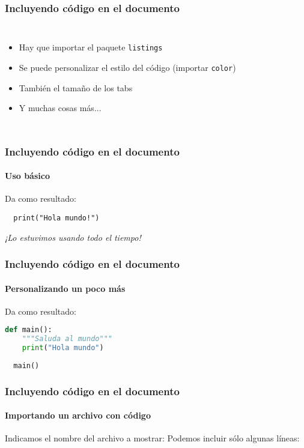 \documentclass[svgnames]{beamer}
\begin{document}
\begin{frame}
  \frametitle{Incluyendo código en el documento}
  \begin{columns}
    \centering
      
    \centering
      \begin{itemize}
        \item Hay que importar el paquete \texttt{listings}
        \item Se puede personalizar el estilo del código (importar \texttt{color})
        \item También el tamaño de los tabs
        \item Y muchas cosas más...
      \end{itemize}
  \end{columns}
\end{frame}


\begin{frame}[fragile]
  \frametitle{Incluyendo código en el documento}
  \framesubtitle{Uso básico}
  
  Da como resultado:
  \begin{lstlisting}
  print("Hola mundo!")
  \end{lstlisting}\pause
  \emph{¡Lo estuvimos usando todo el tiempo!}
\end{frame}

\begin{frame}[fragile]
  \frametitle{Incluyendo código en el documento}
  \framesubtitle{Personalizando un poco más}
  
  Da como resultado:
  \begin{lstlisting}[language=python]
  def main():
    """Saluda al mundo"""
    print("Hola mundo")
  
  main()
  \end{lstlisting}
\end{frame}

\begin{frame}[fragile]
  \frametitle{Incluyendo código en el documento}
  \framesubtitle{Importando un archivo con código}
  Indicamos el nombre del archivo a mostrar:
  \pause
  Podemos incluir sólo algunas líneas:
  

\end{frame}
\end{document}
